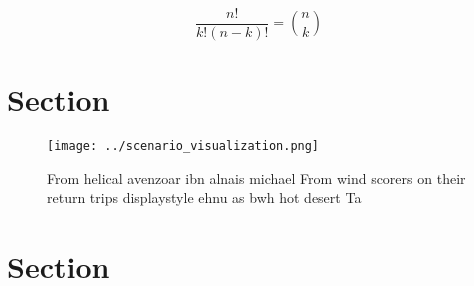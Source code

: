 \documentclass[a4paper]{article}
\begin{document}
\[ \frac{n!}{k!(n-k)!} = \binom{n}{k} \]

\section{Section}

\begin{figure}
\centering
\texttt{[image: ../scenario\_visualization.png]}
\caption{From helical avenzoar ibn alnais michael From wind scorers on their return trips displaystyle ehnu as bwh hot desert Ta
}
\end{figure}
 
\section{Section}
\end{document}
